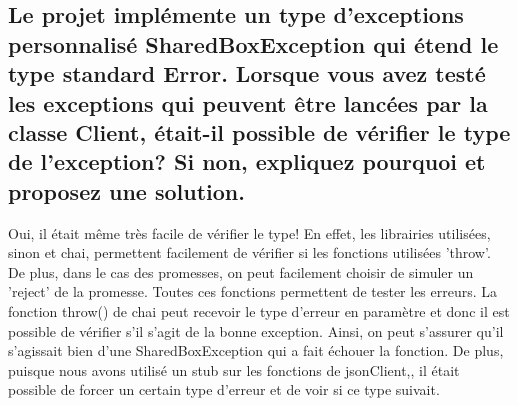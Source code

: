\documentclass{article}
\begin{document}
\subsection*{Le projet implémente un type d’exceptions personnalisé SharedBoxException
  qui étend le type standard Error. Lorsque vous avez testé les exceptions qui
  peuvent être lancées par la classe Client, était-il possible de vérifier le type de
  l’exception? Si non, expliquez pourquoi et proposez une solution.}
	Oui, il était même très facile de vérifier le type!
	En effet, les librairies utilisées, sinon et chai, permettent facilement de vérifier si les fonctions utilisées 'throw'.
	De plus, dans le cas des promesses, on peut facilement choisir de simuler un 'reject' de la promesse.
	Toutes ces fonctions permettent de tester les erreurs.
	La fonction throw() de chai peut recevoir le type d'erreur en paramètre et donc il est possible de vérifier s'il s'agit de la bonne exception.
	Ainsi, on peut s'assurer qu'il s'agissait bien d'une SharedBoxException qui a fait échouer la fonction.
	De plus, puisque nous avons utilisé un stub sur les fonctions de jsonClient,, il était possible de forcer un certain type d'erreur et de voir si ce type suivait.
\end{document}
